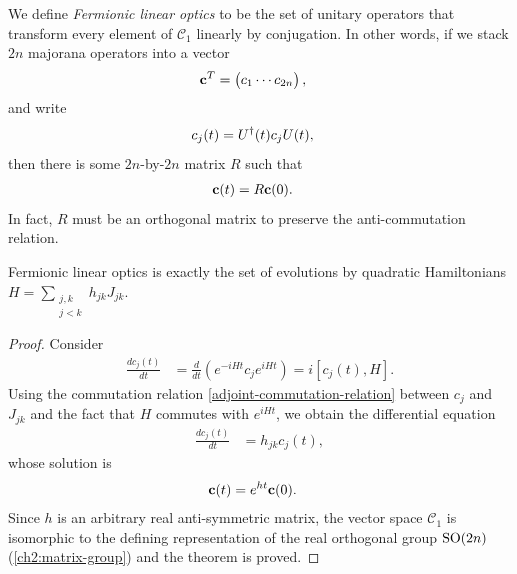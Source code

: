 We define \emph{Fermionic linear optics} to be the set of unitary operators that transform every element of $\mathcal{C}_1$ linearly by conjugation. In other words, if we stack $2n$ majorana operators into a vector
\begin{align}
	{\bf c}^T &= \begin{pmatrix}
		c_1 \cdots c_{2n}
	\end{pmatrix},
\end{align}
and write
\begin{align}
	c_j(t) &= U^{\dagger}(t) c_j U(t),
\end{align}
then there is some $2n$-by-$2n$ matrix $R$ such that
\begin{align}
	{\bf c}(t) &= R {\bf c}(0).
\end{align}
In fact, $R$ must be an orthogonal matrix to preserve the anti-commutation relation.
\begin{theorem}
Fermionic linear optics is exactly the set of evolutions by quadratic Hamiltonians $H = \sum_{\substack{j,k \\ j<k}} h_{jk} J_{jk}$.
\end{theorem}\label{thm:adjoint-action}
\begin{proof}
	Consider
	\begin{align}
		\frac{dc_j(t)}{dt}
			&= \frac{d}{dt}\left(e^{-iHt} c_j e^{iHt}\right) = i[c_j(t),H].
	\end{align}
	Using the commutation relation \eqref{adjoint-commutation-relation} between $c_j$ and $J_{jk}$ and the fact that $H$ commutes with $e^{iHt}$, we obtain the differential equation
	\begin{align}
		\frac{dc_j(t)}{dt} &= h_{jk} c_j(t),
	\end{align}
	whose solution is
	\begin{align}
		{\bf c}(t) &= e^{ht} {\bf c}(0).
	\end{align}
	Since $h$ is an arbitrary real anti-symmetric matrix, the vector space $\mathcal{C}_1$ is isomorphic to the defining representation of the real orthogonal group $\text{SO}(2n)$ (\autoref{ch2:matrix-group}) and the theorem is proved.
\end{proof}


